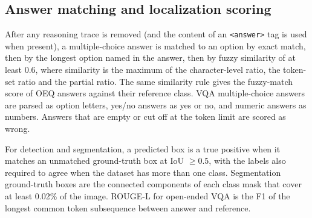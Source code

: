 \documentclass[10pt,letterpaper]{article}
\newcommand{\code}[1]{\texttt{#1}}
\begin{document}
\subsection{Answer matching and localization scoring}
\label{app:matching}
After any reasoning trace is removed (and the content of an \code{<answer>} tag is used when present), a multiple-choice answer is matched to an option by exact match, then by the longest option named in the answer, then by fuzzy similarity of at least 0.6, where similarity is the maximum of the character-level ratio, the token-set ratio and the partial ratio. The same similarity rule gives the fuzzy-match score of OEQ answers against their reference class. VQA multiple-choice answers are parsed as option letters, yes/no answers as yes or no, and numeric answers as numbers. Answers that are empty or cut off at the token limit are scored as wrong.

For detection and segmentation, a predicted box is a true positive when it matches an unmatched ground-truth box at IoU $\geq 0.5$, with the labels also required to agree when the dataset has more than one class. Segmentation ground-truth boxes are the connected components of each class mask that cover at least 0.02\% of the image. ROUGE-L for open-ended VQA is the F1 of the longest common token subsequence between answer and reference.
\end{document}
